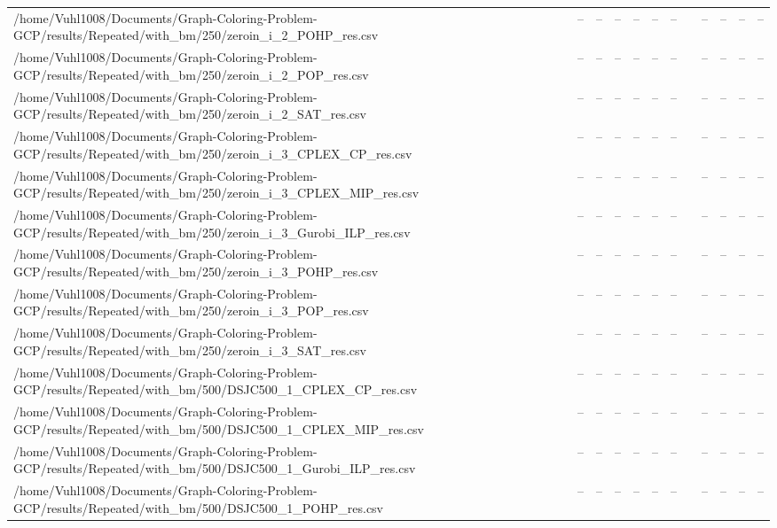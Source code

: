 \begin{table}[htbp]
\begin{tabular}{llllllllllll}
/home/Vuhl1008/Documents/Graph-Coloring-Problem-GCP/results/Repeated/with\_bm/250/zeroin\_i\_2\_POHP\_res.csv & -- & -- & -- & -- & -- & -- & {} & -- & -- & -- & -- \\
/home/Vuhl1008/Documents/Graph-Coloring-Problem-GCP/results/Repeated/with\_bm/250/zeroin\_i\_2\_POP\_res.csv & -- & -- & -- & -- & -- & -- & {} & -- & -- & -- & -- \\
/home/Vuhl1008/Documents/Graph-Coloring-Problem-GCP/results/Repeated/with\_bm/250/zeroin\_i\_2\_SAT\_res.csv & -- & -- & -- & -- & -- & -- & {} & -- & -- & -- & -- \\
/home/Vuhl1008/Documents/Graph-Coloring-Problem-GCP/results/Repeated/with\_bm/250/zeroin\_i\_3\_CPLEX\_CP\_res.csv & -- & -- & -- & -- & -- & -- & {} & -- & -- & -- & -- \\
/home/Vuhl1008/Documents/Graph-Coloring-Problem-GCP/results/Repeated/with\_bm/250/zeroin\_i\_3\_CPLEX\_MIP\_res.csv & -- & -- & -- & -- & -- & -- & {} & -- & -- & -- & -- \\
/home/Vuhl1008/Documents/Graph-Coloring-Problem-GCP/results/Repeated/with\_bm/250/zeroin\_i\_3\_Gurobi\_ILP\_res.csv & -- & -- & -- & -- & -- & -- & {} & -- & -- & -- & -- \\
/home/Vuhl1008/Documents/Graph-Coloring-Problem-GCP/results/Repeated/with\_bm/250/zeroin\_i\_3\_POHP\_res.csv & -- & -- & -- & -- & -- & -- & {} & -- & -- & -- & -- \\
/home/Vuhl1008/Documents/Graph-Coloring-Problem-GCP/results/Repeated/with\_bm/250/zeroin\_i\_3\_POP\_res.csv & -- & -- & -- & -- & -- & -- & {} & -- & -- & -- & -- \\
/home/Vuhl1008/Documents/Graph-Coloring-Problem-GCP/results/Repeated/with\_bm/250/zeroin\_i\_3\_SAT\_res.csv & -- & -- & -- & -- & -- & -- & {} & -- & -- & -- & -- \\
/home/Vuhl1008/Documents/Graph-Coloring-Problem-GCP/results/Repeated/with\_bm/500/DSJC500\_1\_CPLEX\_CP\_res.csv & -- & -- & -- & -- & -- & -- & {} & -- & -- & -- & -- \\
/home/Vuhl1008/Documents/Graph-Coloring-Problem-GCP/results/Repeated/with\_bm/500/DSJC500\_1\_CPLEX\_MIP\_res.csv & -- & -- & -- & -- & -- & -- & {} & -- & -- & -- & -- \\
/home/Vuhl1008/Documents/Graph-Coloring-Problem-GCP/results/Repeated/with\_bm/500/DSJC500\_1\_Gurobi\_ILP\_res.csv & -- & -- & -- & -- & -- & -- & {} & -- & -- & -- & -- \\
/home/Vuhl1008/Documents/Graph-Coloring-Problem-GCP/results/Repeated/with\_bm/500/DSJC500\_1\_POHP\_res.csv & -- & -- & -- & -- & -- & -- & {} & -- & -- & -- & -- \\

\end{tabular}
\end{table}
